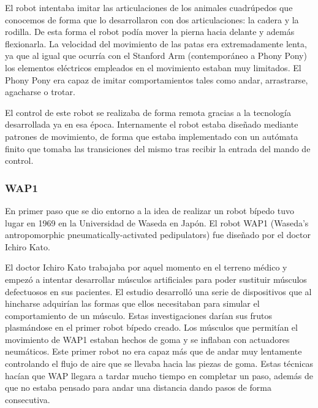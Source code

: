 \vspace{10px}

El robot intentaba imitar las articulaciones de los animales cuadrúpedos que conocemos de forma que lo desarrollaron con dos articulaciones: la cadera y la rodilla. De esta forma el robot podía mover la pierna hacia delante y además flexionarla. La velocidad del movimiento de las patas era extremadamente lenta, ya que al igual que ocurría con el Stanford Arm (contemporáneo a Phony Pony) los elementos eléctricos empleados en el movimiento estaban muy limitados. El Phony Pony era capaz de imitar comportamientos tales como andar, arrastrarse, agacharse o trotar.

\vspace{10px}

El control de este robot se realizaba de forma remota gracias a la tecnología desarrollada ya en esa época. Internamente el robot estaba diseñado mediante patrones de movimiento, de forma que estaba implementado con un autómata finito que tomaba las transiciones del mismo tras recibir la entrada del mando de control.

\subsubsection{WAP1}
En primer paso que se dio entorno a la idea de realizar un robot bípedo tuvo lugar en 1969 en la Universidad de Waseda en Japón. El robot WAP1 (Waseda's antropomorphic pneumatically-activated pedipulators) fue diseñado por el doctor Ichiro Kato.

\vspace{10px}

El doctor Ichiro Kato trabajaba por aquel momento en el terreno médico y empezó a intentar desarrollar músculos artificiales para poder sustituir músculos defectuosos en sus pacientes. El estudio desarrolló una serie de dispositivos que al hincharse adquirían las formas que ellos necesitaban para simular el comportamiento de un músculo. Estas investigaciones darían sus frutos plasmándose en el primer robot bípedo creado. Los músculos que permitían el movimiento de WAP1 estaban hechos de goma y se inflaban con actuadores neumáticos. Este primer robot no era capaz más que de andar muy lentamente controlando el flujo de aire que se llevaba hacia las piezas de goma. Estas técnicas hacían que WAP llegara a tardar mucho tiempo en completar un paso, además de que no estaba pensado para andar una distancia dando pasos de forma consecutiva.

